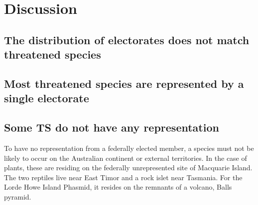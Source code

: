 \documentclass[a4paper,11pt]{article}
\begin{document}



\section{Discussion}

\subsection{The distribution of electorates does not match threatened species} 

\subsection{Most threatened species are represented by a single electorate}

\subsection{Some TS do not have any representation}
To have no representation from a federally elected member, a species must not be likely to occur on the Australian continent or external territories. In the case of plants, these are residing on the federally unrepresented site of Macquarie Island. The two reptiles live near East Timor and a rock islet near Tasmania. For the Lorde Howe Island Phasmid, it resides on the remnants of a volcano, Balls pyramid. 
\end{document}
